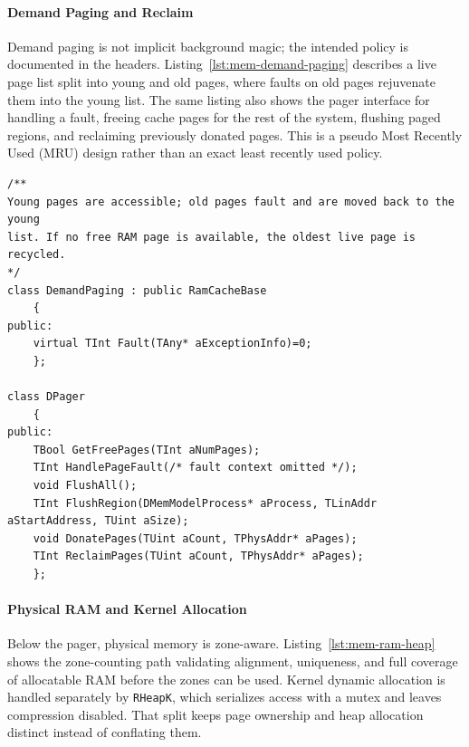 \paragraph{Demand Paging and Reclaim}

Demand paging is not implicit background magic; the intended policy is
documented in the headers. Listing~\ref{lst:mem-demand-paging} describes a live
page list split into young and old pages, where faults on old pages rejuvenate
them into the young list. The same listing also shows the pager interface for
handling a fault, freeing cache pages for the rest of the system, flushing
paged regions, and reclaiming previously donated pages. This is a pseudo Most
Recently Used (MRU) design rather than an exact least recently used policy.

\begin{listing}[H]
\begin{verbatim}
/**
Young pages are accessible; old pages fault and are moved back to the young
list. If no free RAM page is available, the oldest live page is recycled.
*/
class DemandPaging : public RamCacheBase
	{
public:
	virtual TInt Fault(TAny* aExceptionInfo)=0;
	};

class DPager
	{
public:
	TBool GetFreePages(TInt aNumPages);
	TInt HandlePageFault(/* fault context omitted */);
	void FlushAll();
	TInt FlushRegion(DMemModelProcess* aProcess, TLinAddr aStartAddress, TUint aSize);
	void DonatePages(TUint aCount, TPhysAddr* aPages);
	TInt ReclaimPages(TUint aCount, TPhysAddr* aPages);
	};
\end{verbatim}
\caption{Demand-paging policy and pager control surface. Files:
\texttt{demand\_paging.h} and \texttt{flexible/mmu/mpager.h}.}
\label{lst:mem-demand-paging}
\end{listing}

\paragraph{Physical RAM and Kernel Allocation}

Below the pager, physical memory is zone-aware. Listing~\ref{lst:mem-ram-heap}
shows the zone-counting path validating alignment, uniqueness, and full
coverage of allocatable RAM before the zones can be used. Kernel
dynamic allocation is handled separately by \texttt{RHeapK}, which serializes
access with a mutex and leaves compression disabled. That split keeps page
ownership and heap allocation distinct instead of conflating them.

